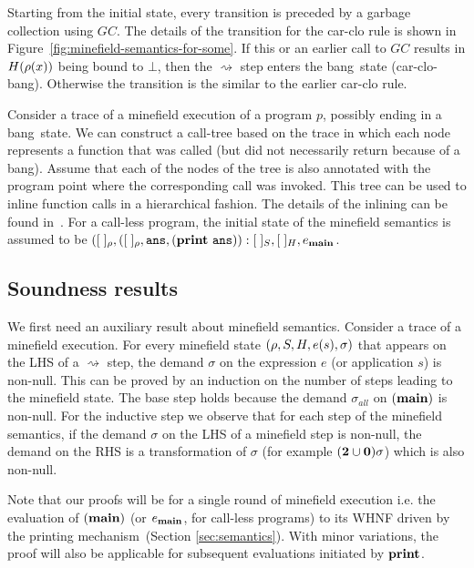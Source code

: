 \documentclass[preprint, 9pt]{sigplanconf}
\newcommand{\bang}{\mbox{\sc bang}}
\begin{document}
Starting from the initial state,
every transition  is preceded  by a  garbage collection
using $GC$.  The details of the transition for the {\sc
  car-clo}  rule   is  shown   in
Figure~\ref{fig:minefield-semantics-for-some}.  If  this  or  an
earlier  call to  $GC$  results  in $H(\rho(x))$  being
bound  to  $\bot$,  then  the  $\rightsquigarrow$  step
enters the  \bang\ state ({\sc  car-clo-bang}). Otherwise
the transition is the similar to the earlier {\sc car-clo}
rule. 



Consider a trace  of a minefield execution of a  program $p$, possibly
ending in  a \bang\ state. We  can construct a call-tree  based on the
trace in  which each node represents  a function that was  called (but
did not necessarily  return because of a \bang).  Assume  that each of
the nodes of  the tree is also annotated with  the program point where
the corresponding call  was invoked.  This tree can be  used to inline
function calls in a hierarchical fashion.  The details of the inlining
can be found in~\cite{asati14lgc}.
For  a
call-less program,  the initial state of  the minefield
semantics  is  assumed  to  be  $([\;]_\rho,([\;]_\rho,
\mathbf{\mbox{\tt ans}},      (\mathbf{print}~\mathbf{\mbox{\tt ans}})):[\;]_{S}     ,      [\;]_{H},
e_{\mathbf{main}}$.
   
 
\subsection{Soundness results}
We first need an auxiliary  result about minefield semantics. Consider
a trace of  a minefield execution.  For every  minefield state $(\rho,
S,   H,  e(s),   \sigma)$   that   appears  on   the   LHS  of   a
$\rightsquigarrow$ step, the demand $\sigma$ on the expression $e$ (or
application $s$) is  non-null.  This can be proved by  an induction on
the number  of steps leading  to the  minefield state.  The  base step
holds   because  the   demand   $\sigma_{\mathit{all}}$   on  $(\mathbf{main})$   is
non-null. For the inductive step we  observe that for each step of the
minefield semantics, if the demand $\sigma$  on the LHS of a minefield
step  is non-null,  the  demand  on the  RHS  is  a transformation  of
$\sigma$ (for example $({\mathbf{2}}\cup\mathbf{0})\sigma$) which is also non-null.

Note that our proofs will be for a single round of minefield execution
i.e.  the evaluation of $(\mathbf{main})$ (or $e_{\mathbf{main}}$, for call-less
programs)  to   its  WHNF  driven  by   the  printing  mechanism~(Section
\ref{sec:semantics}).  With  minor variations,  the proof will  also be
applicable for subsequent evaluations initiated by $\mathbf{print}$.
\end{document}
